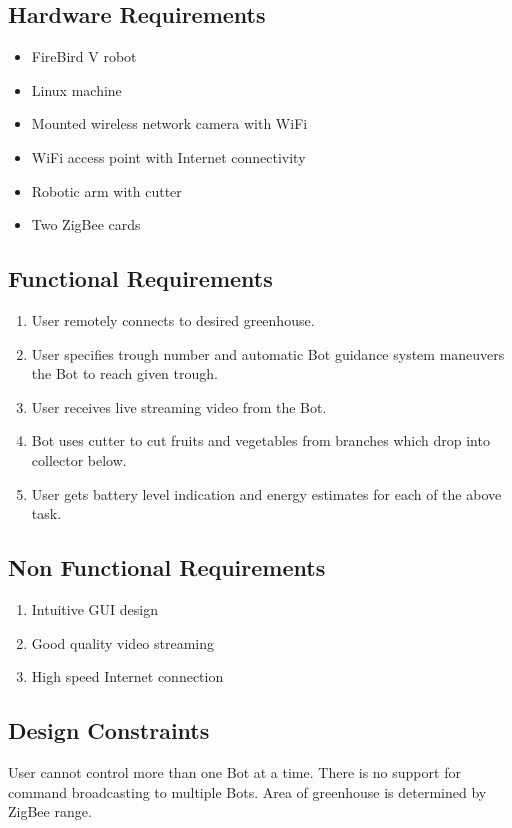 \documentclass[a4paper, 12pt]{article}
\begin{document}
\subsection{Hardware Requirements}
\begin{itemize}
 \item FireBird V robot
 \item Linux machine
 \item Mounted wireless network camera with WiFi
 \item WiFi access point with Internet connectivity
 \item Robotic arm with cutter
 \item Two ZigBee cards
\end{itemize}

\subsection{Functional Requirements}
\begin{enumerate}
 \item User remotely connects to desired greenhouse.
 \item User specifies trough number and automatic Bot guidance system maneuvers the Bot to reach given trough.
 \item User receives live streaming video from the Bot.
 \item Bot uses cutter to cut fruits and vegetables from branches which drop into collector below.
 \item User gets battery level indication and energy estimates for each of the above task.
\end{enumerate}

\subsection{Non Functional Requirements}
\begin{enumerate}
 \item Intuitive GUI design
 \item Good quality video streaming
 \item High speed Internet connection
\end{enumerate}

\subsection{Design Constraints}
User cannot control more than one Bot at a time. There is no support for command broadcasting to multiple Bots.
Area of greenhouse is determined by ZigBee range.
\end{document}
